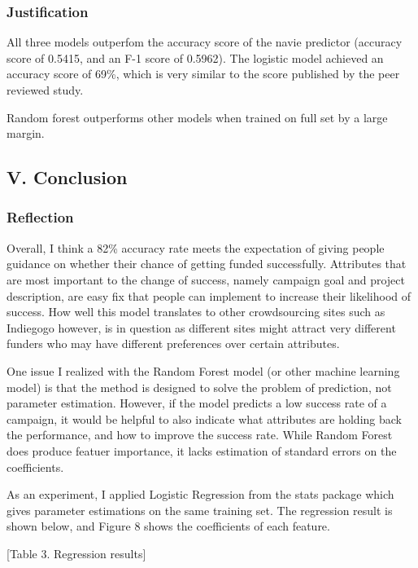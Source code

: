 \documentclass[11pt]{article}
\begin{document}
\subsubsection{Justification}\label{justification}

All three models outperfom the accuracy score of the navie predictor
(accuracy score of 0.5415, and an F-1 score of 0.5962). The logistic
model achieved an accuracy score of 69\%, which is very similar to the
score published by the peer reviewed study.

Random forest outperforms other models when trained on full set by a
large margin.

\subsection{V. Conclusion}\label{v.-conclusion}

\subsubsection{Reflection}\label{reflection}

Overall, I think a 82\% accuracy rate meets the expectation of giving
people guidance on whether their chance of getting funded successfully.
Attributes that are most important to the change of success, namely
campaign goal and project description, are easy fix that people can
implement to increase their likelihood of success. How well this model
translates to other crowdsourcing sites such as Indiegogo however, is in
question as different sites might attract very different funders who may
have different preferences over certain attributes.

One issue I realized with the Random Forest model (or other machine
learning model) is that the method is designed to solve the problem of
prediction, not parameter estimation. However, if the model predicts a
low success rate of a campaign, it would be helpful to also indicate
what attributes are holding back the performance, and how to improve the
success rate. While Random Forest does produce featuer importance, it
lacks estimation of standard errors on the coefficients.

As an experiment, I applied Logistic Regression from the stats package
which gives parameter estimations on the same training set. The
regression result is shown below, and Figure 8 shows the coefficients of
each feature.

{[}Table 3. Regression results{]}
\end{document}
